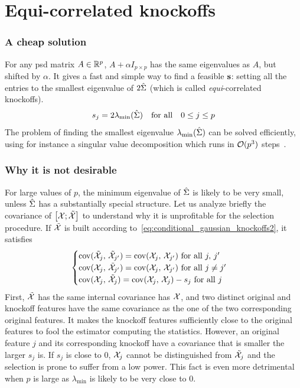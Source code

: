 \section{Equi-correlated knockoffs}\label{sec:equi}

\subsubsection{A cheap solution}

For any psd matrix $A \in \mathbb{R}^p$, $A + \alpha I_{p \times p}$ has the same eigenvalues as $A$, but shifted by $\alpha$.
It gives a fast and simple way to find a feasible $\mathbf{s}$:
setting all the entries to the smallest eigenvalue of $2\hat{\Sigma}$ (which is called \textit{equi}-correlated knockoffs).
\begin{equation}\label{eq:equi}
    s_j = 2\lambda_{\min}(\hat{\Sigma})
    \quad\text{for all}\quad 0 \leq j \leq p
\end{equation}
The problem of finding the smallest eigenvalue $\lambda_{\min}(\hat{\Sigma})$ can be solved efficiently,
using for instance a singular value decomposition which runs in $\mathcal{O}(p^3)$ steps~\citep{svd}.

\subsubsection{Why it is not desirable}

For large values of $p$,
the minimum eigenvalue of $\hat{\Sigma}$ is likely to be very small,
unless $\hat{\Sigma}$ has a substantially special structure.
Let us analyze briefly the covariance of $\big[ \mathcal{X}; \tilde{\mathcal{X}} \big]$
to understand why it is unprofitable for the selection procedure.
If $\tilde{\mathcal{X}}$ is built according to~\ref{eq:conditional_gaussian_knockoffs2}, it satisfies
\begin{equation*}
    \begin{cases}
        \operatorname*{cov}(\tilde{\mathcal{X}}_j,\, \tilde{\mathcal{X}}_{j'}) = \operatorname*{cov}(\mathcal{X}_j,\, \mathcal{X}_{j'}) \text{ for all } j,\, j'\\
        \operatorname*{cov}(\mathcal{X}_j,\, \tilde{\mathcal{X}}_{j'}) = \operatorname*{cov}(\mathcal{X}_j,\, \mathcal{X}_{j'}) \text{ for all } j \neq j'\\
        \operatorname*{cov}(\mathcal{X}_j,\, \tilde{\mathcal{X}}_j) = \operatorname*{cov}(\mathcal{X}_j,\, \mathcal{X}_j) - s_j \text{ for all } j
    \end{cases}
\end{equation*}
First, $\tilde{\mathcal{X}}$ has the same internal covariance has $\mathcal{X}$,
and two distinct original and knockoff features have the same covariance
as the one of the two corresponding original features.
It makes the knockoff features sufficiently close to the original features
to fool the estimator computing the statistics.
However, an original feature $j$ and its corresponding knockoff have a covariance that is smaller the larger $s_j$ is.
If $s_j$ is close to $0$,
$\mathcal{X}_j$ cannot be distinguished from $\tilde{\mathcal{X}}_j$ and the selection is prone to suffer from a low power.
This fact is even more detrimental when $p$ is large as $\lambda_{\min}$ is likely to be very close to $0$.

